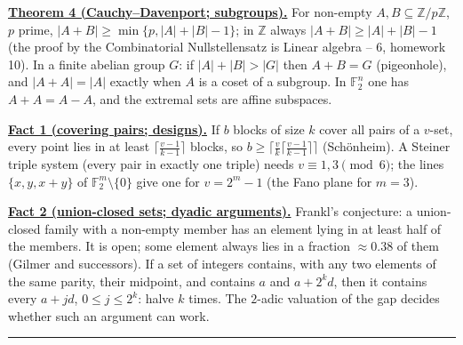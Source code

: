 \documentclass[11pt,a4paper]{article}
\newcommand{\head}[1]{\par\medskip\noindent\textbf{\underline{#1}}\quad}
\begin{document}
\head{Theorem 4 (Cauchy--Davenport; subgroups).} For non-empty $A,B\subseteq\mathbb Z/p\mathbb Z$,
$p$ prime, $|A+B|\geqslant\min\{p,|A|+|B|-1\}$; in $\mathbb Z$ always
$|A+B|\geqslant|A|+|B|-1$ (the proof by the Combinatorial Nullstellensatz is Linear
algebra -- 6, homework 10). In a finite abelian group $G$: if $|A|+|B|>|G|$ then $A+B=G$ (pigeonhole), and
$|A+A|=|A|$ exactly when $A$ is a coset of a subgroup. In $\mathbb F_2^n$ one has $A+A=A-A$,
and the extremal sets are affine subspaces.

\head{Fact 1 (covering pairs; designs).} If $b$ blocks of size $k$ cover all pairs of a
$v$-set, every point lies in at least $\lceil\frac{v-1}{k-1}\rceil$ blocks, so
$b\geqslant\lceil\frac vk\lceil\frac{v-1}{k-1}\rceil\rceil$ (Sch\"onheim). A Steiner triple
system (every pair in exactly one triple) needs $v\equiv1,3\pmod 6$; the lines
$\{x,y,x+y\}$ of $\mathbb F_2^m\setminus\{0\}$ give one for $v=2^m-1$ (the Fano plane for $m=3$).

\head{Fact 2 (union-closed sets; dyadic arguments).} Frankl's conjecture: a union-closed
family with a non-empty member has an element lying in at least half of the members. It is
open; some element always lies in a fraction $\approx0.38$ of them (Gilmer and successors). If
a set of integers contains, with any two elements of the same parity, their midpoint, and
contains $a$ and $a+2^kd$, then it contains every $a+jd$, $0\leqslant j\leqslant2^k$: halve
$k$ times. The $2$-adic valuation of the gap decides whether such an argument can work.

\medskip\noindent\rule{\linewidth}{0.4pt}
\end{document}
